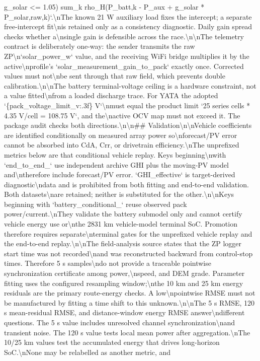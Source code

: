 \documentclass[a4paper,11pt]{article}
\begin{document}
\begin{enumerate}[leftmargin=1.8em]
g\_solar <= 1.05) sum\_k rho\_H(P\_batt,k - P\_aux + g\_solar * P\_solar,raw,k)`.\textbackslash{}nThe known 21 W auxiliary load fixes the intercept; a separate free-intercept fit\textbackslash{}nis retained only as a consistency diagnostic. Daily gain spread checks whether a\textbackslash{}nsingle gain is defensible across the race.\textbackslash{}n\textbackslash{}nThe telemetry contract is deliberately one-way: the sender transmits the raw ZP\textbackslash{}n`solar\_power\_w` value, and the receiving WiFi bridge multiplies it by the active\textbackslash{}nprofile's `solar\_measurement\_gain\_to\_pack` exactly once. Corrected values must not\textbackslash{}nbe sent through that raw field, which prevents double calibration.\textbackslash{}n\textbackslash{}nThe battery terminal-voltage ceiling is a hardware constraint, not a value fitted\textbackslash{}nfrom a loaded discharge trace. For YATA the adopted `\{pack\_voltage\_limit\_v:.3f\} V`\textbackslash{}nmust equal the product limit `25 series cells * 4.35 V/cell = 108.75 V`, and the\textbackslash{}nactive OCV map must not exceed it. The package audit checks both directions.\textbackslash{}n\textbackslash{}n\#\# Validation\textbackslash{}n\textbackslash{}nVehicle coefficients are identified conditionally on measured array power so\textbackslash{}nforecast/PV error cannot be absorbed into CdA, Crr, or drivetrain efficiency.\textbackslash{}nThe unprefixed metrics below are that conditional vehicle replay.  Keys beginning\textbackslash{}nwith `end\_to\_end\_` use independent archive GHI plus the moving-PV model and\textbackslash{}ntherefore include forecast/PV error. `GHI\_effective` is target-derived diagnostic\textbackslash{}ndata and is prohibited from both fitting and end-to-end validation. Both datasets\textbackslash{}nare retained; neither is substituted for the other.\textbackslash{}n\textbackslash{}nKeys beginning with `battery\_conditional\_` reuse observed pack power/current.\textbackslash{}nThey validate the battery submodel only and cannot certify vehicle energy use or\textbackslash{}nthe 2831 km vehicle-model terminal SoC. Promotion therefore requires separate\textbackslash{}nterminal gates for the unprefixed vehicle replay and the end-to-end replay.\textbackslash{}n\textbackslash{}nThe field-analysis source states that the ZP logger start time was not recorded\textbackslash{}nand was reconstructed backward from control-stop times. Therefore 5 s samples\textbackslash{}ndo not provide a traceable pointwise synchronization certificate among power,\textbackslash{}nspeed, and DEM grade. Parameter fitting uses the configured resampling window;\textbackslash{}nthe 10 km and 25 km energy residuals are the primary route-energy checks. A low\textbackslash{}npointwise RMSE must not be manufactured by fitting a time shift to this unknown.\textbackslash{}n\textbackslash{}nThe 5 s RMSE, 120 s mean-residual RMSE, and distance-window energy RMSE answer\textbackslash{}ndifferent questions. The 5 s value includes unresolved channel synchronization\textbackslash{}nand transient noise. The 120 s value tests local mean power after aggregation.\textbackslash{}nThe 10/25 km values test the accumulated energy that drives long-horizon SoC.\textbackslash{}nNone may be relabelled as another metric, and 
\end{enumerate}
\end{document}
